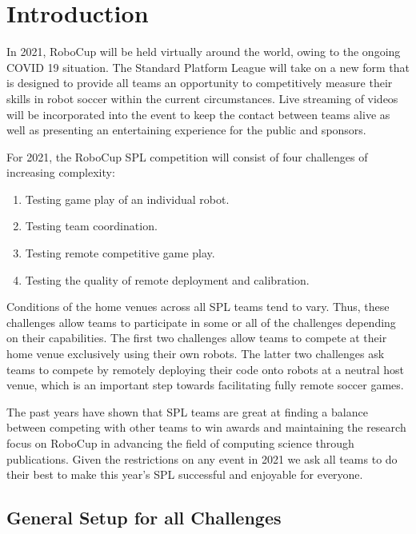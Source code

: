 \section{Introduction}

In 2021, RoboCup will be held virtually around the world, owing to the ongoing COVID 19 situation. The Standard Platform League will take on a new form that is designed to provide all teams an opportunity to competitively measure their skills in robot soccer within the current circumstances. 
Live streaming of videos will be incorporated into the event to keep the contact between teams alive as well as presenting an entertaining experience for the public and sponsors.

For 2021, the RoboCup SPL competition will consist of four challenges of increasing complexity:

\begin{enumerate}
    \item Testing game play of an individual robot. 
    \item Testing team coordination.
    \item Testing remote competitive game play. 
    \item Testing the quality of remote deployment and calibration.
\end{enumerate}

Conditions of the home venues across all SPL teams tend to vary. Thus, these challenges allow teams to participate in some or all of the challenges depending on their capabilities. The first two challenges allow teams to compete at their home venue exclusively using their own robots. The latter two challenges ask teams to compete by remotely deploying their code onto robots at a neutral host venue, which is an important step towards facilitating fully remote soccer games.

The past years have shown that SPL teams are great at finding a balance between competing with other teams to win awards and maintaining the research focus on RoboCup in advancing the field of computing science through publications. Given the restrictions on any event in 2021 we ask all teams to do their best to make this year's SPL successful and enjoyable for everyone. 

\subsection{General Setup for all Challenges}

